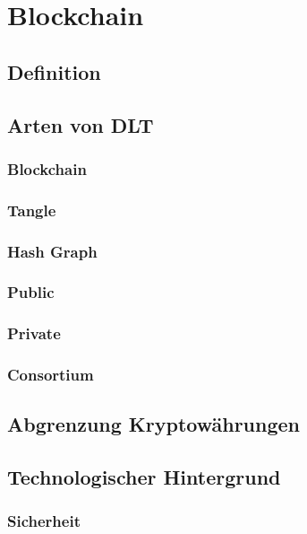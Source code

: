 \section{Blockchain}

\subsection{Definition}

\subsection{Arten von DLT}

\subsubsection{Blockchain}

\subsubsection{Tangle}

\subsubsection{Hash Graph}

\subsubsection{Public}

\subsubsection{Private}

\subsubsection{Consortium}

\subsection{Abgrenzung Kryptowährungen}

\subsection{Technologischer Hintergrund}

\subsubsection{Sicherheit}

